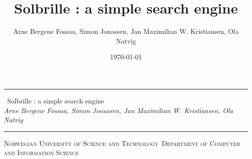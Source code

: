 \title{Solbrille : a simple search engine}
\author{Arne Bergene Fossaa, Simon Jonassen, Jan Maximilian W. Kristiansen, Ola Natvig}
\date{\today}

\newcommand{\HRule}{\rule{\linewidth}{1mm}}

\noindent\HRule
\begin{center}
  \huge
  \noindent \ Solbrille : a simple search engine \\ [7mm] \large
  \noindent \emph{Arne Bergene Fossaa, Simon Jonassen, Jan Maximilian W. Kristiansen, Ola Natvig}
\end{center}
\noindent\HRule
{}
\begin{center}
\Large\textsc{Norwegian University of Science and Technology}\
\Large\textsc{Department of Computer and Information Science}\
\end{center}
